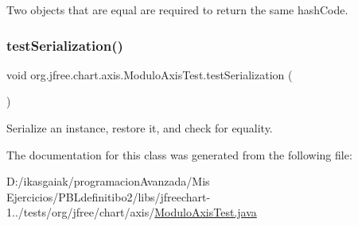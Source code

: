Two objects that are equal are required to return the same hash\+Code. \mbox{\label{classorg_1_1jfree_1_1chart_1_1axis_1_1_modulo_axis_test_a9b00ded79f1007a30e429b7627ffd754}} 
\subsubsection{\texorpdfstring{test\+Serialization()}{testSerialization()}}
{\footnotesize\ttfamily void org.\+jfree.\+chart.\+axis.\+Modulo\+Axis\+Test.\+test\+Serialization (\begin{DoxyParamCaption}{ }\end{DoxyParamCaption})}

Serialize an instance, restore it, and check for equality. 

The documentation for this class was generated from the following file\+:\begin{DoxyCompactItemize}
\item 
D\+:/ikasgaiak/programacion\+Avanzada/\+Mis Ejercicios/\+P\+B\+Ldefinitibo2/libs/jfreechart-\/1../tests/org/jfree/chart/axis/\mbox{\hyperlink{_modulo_axis_test_8java}{Modulo\+Axis\+Test.\+java}}\end{DoxyCompactItemize}
